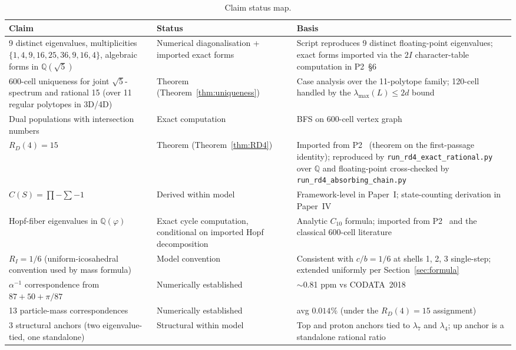 \documentclass[12pt]{article}
\newcommand{\phig}{\varphi}
\begin{document}
\begin{table}[ht]
\centering
\caption{Claim status map.}
\label{tab:status}
\begin{tabular}{@{}lll@{}}
\toprule
Claim & Status & Basis \\
\midrule
9 distinct eigenvalues, multiplicities $\{1,4,9,16,25,36,9,16,4\}$, algebraic forms in $\mathbb{Q}(\sqrt{5})$ & Numerical diagonalisation + imported exact forms & Script reproduces 9 distinct floating-point eigenvalues; exact forms imported via the $2I$ character-table computation in P2~\S 6~\citep{CascadeAlgSubstrate} \\
600-cell uniqueness for joint $\sqrt{5}$-spectrum and rational 15 (over 11 regular polytopes in 3D/4D) & Theorem (Theorem~\ref{thm:uniqueness}) & Case analysis over the 11-polytope family; 120-cell handled by the $\lambda_{\max}(L) \leq 2d$ bound \\
Dual populations with intersection numbers & Exact computation & BFS on 600-cell vertex graph \\
$R_D(4) = 15$ & Theorem (Theorem~\ref{thm:RD4}) & Imported from P2~\citep{CascadeAlgSubstrate} (theorem on the first-passage identity); reproduced by \texttt{run\_rd4\_exact\_rational.py} over $\mathbb{Q}$ and floating-point cross-checked by \texttt{run\_rd4\_absorbing\_chain.py} \\
$C(S) = \prod - \sum - 1$ & Derived within model & Framework-level in Paper~I; state-counting derivation in Paper~IV \\
Hopf-fiber eigenvalues in $\mathbb{Q}(\phig)$ & Exact cycle computation, conditional on imported Hopf decomposition & Analytic $C_{10}$ formula; imported from P2~\citep{CascadeAlgSubstrate} and the classical 600-cell literature~\citep{Coxeter1973, DescHopf600} \\
$R_I = 1/6$ (uniform-icosahedral convention used by mass formula) & Model convention & Consistent with $c/b = 1/6$ at shells 1, 2, 3 single-step; extended uniformly per Section~\ref{sec:formula} \\
$\alpha^{-1}$ correspondence from $87 + 50 + \pi/87$ & Numerically established & $\sim$0.81 ppm vs CODATA~2018 \\
13 particle-mass correspondences & Numerically established & avg $0.014\%$ (under the $R_D(4)=15$ assignment) \\
3 structural anchors (two eigenvalue-tied, one standalone) & Structural within model & Top and proton anchors tied to $\lambda_7$ and $\lambda_4$; up anchor is a standalone rational ratio \\

\end{tabular}
\end{table}
\end{document}
